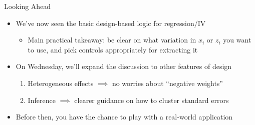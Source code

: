 \documentclass[11pt, english]{beamer}
\begin{document}
	\begin{frame}{Looking Ahead}
		\begin{itemize}
			\item We've now seen the basic design-based logic for regression/IV
				\smallskip
				\begin{itemize}
					\item Main practical takeaway: be clear on what variation in $x_{i}$
						or $z_{i}$ you want to use, and pick controls appropriately for extracting
						it
				\end{itemize}
				\bigskip
				\pause{}

			\item On Wednesday, we'll expand the discussion to other features of
				design
				\smallskip
				\begin{enumerate}
					\item Heterogeneous effects $\implies$ no worries about ``negative weights''
						\smallskip

					\item Inference $\implies$ clearer guidance on how to cluster standard
						errors
				\end{enumerate}
				\bigskip
				\pause{}

			\item Before then, you have the chance to play with a real-world
				application
		\end{itemize}
	\end{frame}
\end{document}
